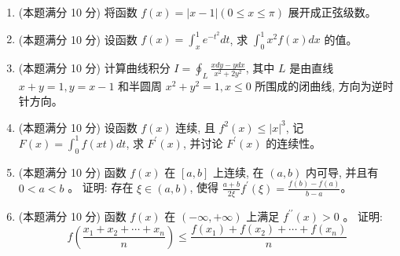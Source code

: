 \begin{enumerate}


\item 
(本题满分 10 分)	
将函数 $f(x)=|x-1|(0 \leqslant x \leqslant \pi)$ 展开成正弦级数。




\item 
(本题满分 10 分)	
设函数 $f(x)=\int_{x}^{1} e^{-t^{2}} d t$, 求 $\int_{0}^{1} x^{2} f(x) d x$ 的值。



\newpage
\item 
(本题满分 10 分)	
计算曲线积分 $I=\oint_{L} \frac{x d y-y d x}{x^{2}+2y^{2}}$, 其中 $L$ 是由直线 $x+y=1, y=x-1$ 和半圆周 $x^{2}+y^{2}=1, x \leqslant 0$ 所围成的闭曲线, 方向为逆时针方向。




\item 
(本题满分 10 分)	
设函数 $f(x)$ 连续, 且 $f^{2}(x) \leqslant|x|^{3}$, 记 $F(x)=\int_{0}^{1} f(x t) d t$, 求 $F^{\prime}(x)$, 并讨论 $F^{\prime}(x)$ 的连续性。




\item 
(本题满分 10 分)	
函数 $f(x)$ 在 $[a, b]$ 上连续, 在 $(a, b)$ 内可导, 并且有 $0<a<b$ 。 证明:
存在 $\xi \in(a, b)$, 使得 $\frac{a+b}{2 \xi} f^{\prime}(\xi)=\frac{f(b)-f(a)}{b-a}$。




\item 
(本题满分 10 分)	
函数 $f(x)$ 在 $(-\infty,+\infty)$ 上满足 $f^{\prime \prime}(x)>0$ 。 证明:
\[
f\left(\frac{x_{1}+x_{2}+\cdots+x_{n}}{n}\right) \leq \frac{f\left(x_{1}\right)+f\left(x_{2}\right)+\cdots+f\left(x_{n}\right)}{n}
\]



\end{enumerate}
